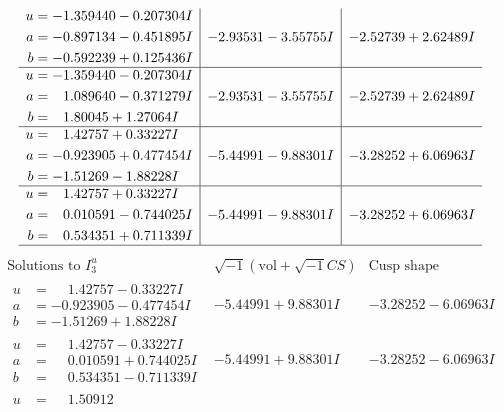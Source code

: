 \documentclass[1p]{elsarticle_modified}
\theoremstyle{definition}
\newcommand{\I}{\sqrt{-1}}
\begin{document}
$$\begin{array}{c|c|c}
\begin{aligned}
u &= -1.359440 - 0.207304 I \\
a &= -0.897134 - 0.451895 I \\
b &= -0.592239 + 0.125436 I\end{aligned}
 & -2.93531 - 3.55755 I & -2.52739 + 2.62489 I \\ \hline\begin{aligned}
u &= -1.359440 - 0.207304 I \\
a &= \phantom{-}1.089640 - 0.371279 I \\
b &= \phantom{-}1.80045 + 1.27064 I\end{aligned}
 & -2.93531 - 3.55755 I & -2.52739 + 2.62489 I \\ \hline\begin{aligned}
u &= \phantom{-}1.42757 + 0.33227 I \\
a &= -0.923905 + 0.477454 I \\
b &= -1.51269 - 1.88228 I\end{aligned}
 & -5.44991 - 9.88301 I & -3.28252 + 6.06963 I \\ \hline\begin{aligned}
u &= \phantom{-}1.42757 + 0.33227 I \\
a &= \phantom{-}0.010591 - 0.744025 I \\
b &= \phantom{-}0.534351 + 0.711339 I\end{aligned}
 & -5.44991 - 9.88301 I & -3.28252 + 6.06963 I\\
 \hline 
 \end{array}$$\newpage$$\begin{array}{c|c|c}  
\text{Solutions to }I^u_{3}& \I (\text{vol} + \sqrt{-1}CS) & \text{Cusp shape}\\
 \hline 
\begin{aligned}
u &= \phantom{-}1.42757 - 0.33227 I \\
a &= -0.923905 - 0.477454 I \\
b &= -1.51269 + 1.88228 I\end{aligned}
 & -5.44991 + 9.88301 I & -3.28252 - 6.06963 I \\ \hline\begin{aligned}
u &= \phantom{-}1.42757 - 0.33227 I \\
a &= \phantom{-}0.010591 + 0.744025 I \\
b &= \phantom{-}0.534351 - 0.711339 I\end{aligned}
 & -5.44991 + 9.88301 I & -3.28252 - 6.06963 I \\ \hline\begin{aligned}
u &= \phantom{-}1.50912\phantom{ +0.000000I} \\

\end{aligned}
\end{array}$$
\end{document}
